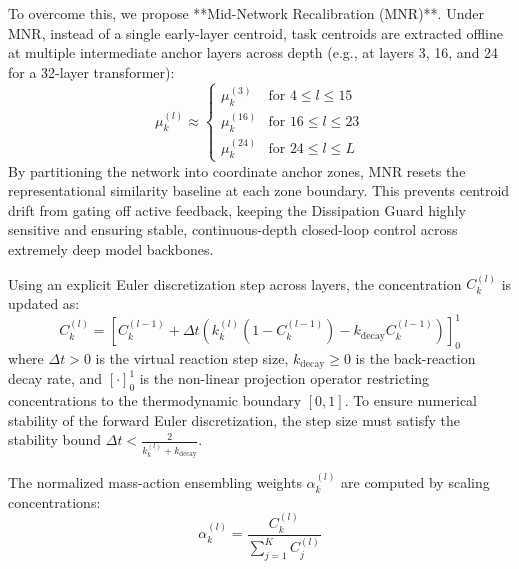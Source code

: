 To overcome this, we propose **Mid-Network Recalibration (MNR)**. Under MNR, instead of a single early-layer centroid, task centroids are extracted offline at multiple intermediate anchor layers across depth (e.g., at layers 3, 16, and 24 for a 32-layer transformer):
\begin{equation}
\mu_k^{(l)} \approx 
\begin{cases}
\mu_k^{(3)} & \text{for } 4 \le l \le 15 \\
\mu_k^{(16)} & \text{for } 16 \le l \le 23 \\
\mu_k^{(24)} & \text{for } 24 \le l \le L
\end{cases}
\label{eq:mnr_recal}
\end{equation}
By partitioning the network into coordinate anchor zones, MNR resets the representational similarity baseline at each zone boundary. This prevents centroid drift from gating off active feedback, keeping the Dissipation Guard highly sensitive and ensuring stable, continuous-depth closed-loop control across extremely deep model backbones.

Using an explicit Euler discretization step across layers, the concentration $C_k^{(l)}$ is updated as:
\begin{equation}
C_k^{(l)} = \left[ C_k^{(l-1)} + \Delta t \left( k_k^{(l)} (1 - C_k^{(l-1)}) - k_{\text{decay}} C_k^{(l-1)} \right) \right]_0^1
\label{eq:euler_concentration}
\end{equation}
where $\Delta t > 0$ is the virtual reaction step size, $k_{\text{decay}} \ge 0$ is the back-reaction decay rate, and $[\cdot]_0^1$ is the non-linear projection operator restricting concentrations to the thermodynamic boundary $[0, 1]$. To ensure numerical stability of the forward Euler discretization, the step size must satisfy the stability bound $\Delta t < \frac{2}{k_k^{(l)} + k_{\text{decay}}}$.

The normalized mass-action ensembling weights $\alpha_k^{(l)}$ are computed by scaling concentrations:
\begin{equation}
\alpha_k^{(l)} = \frac{C_k^{(l)}}{\sum_{j=1}^K C_j^{(l)}}
\label{eq:ensembling_weights}
\end{equation}

